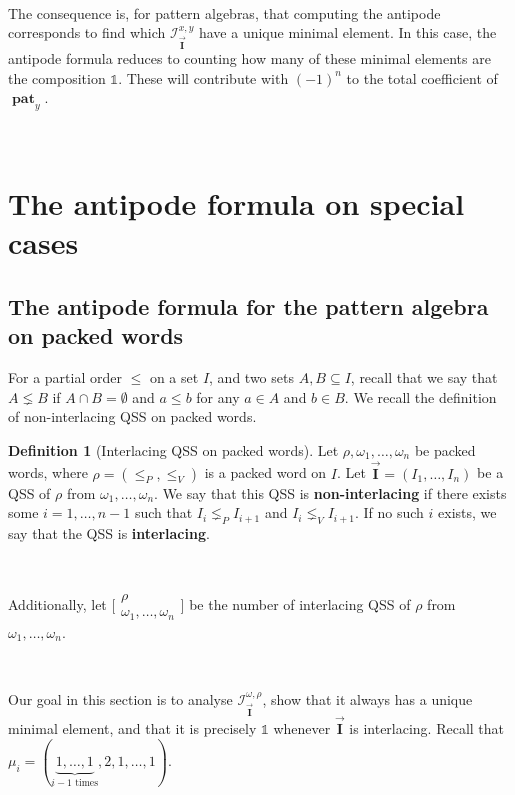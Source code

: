 \documentclass[12pt, reqno]{amsart}
\theoremstyle{definition}
\newtheorem{defin}[thm]{Definition}
\newcommand{\III}{\vec{\mathbf{I}}}
\DeclareMathOperator{\pat}{\mathbf{pat}}
\begin{document}

\

The consequence is, for pattern algebras, that computing the antipode corresponds to find which $\mathcal I_{\III}^{x, y}$ have a unique minimal element.
In this case, the antipode formula reduces to counting how many of these minimal elements are the composition $\mathbb{1}$.
These will contribute with $(-1)^n$ to the total coefficient of $\pat_y$.

\

\section{The antipode formula on special cases\label{sec:formula_pp}}
\subsection{The antipode formula for the pattern algebra on packed words\label{sec:formula_packed}}
For a partial order $\leq$ on a set $I$, and two sets $A, B \subseteq I$, recall that we say that $A \lneq B$ if $A\cap B = \emptyset$ and $a \leq b$ for any $a \in A$ and $b \in B$.
We recall the definition of non-interlacing QSS on packed words.


\begin{defin}[Interlacing QSS on packed words]
Let $\rho, \omega_1, \dots, \omega_n$ be packed words, where $\rho = (\leq_P, \leq_V)$ is a packed word on $I$.
Let $\III = (I_1, \dots, I_n)$ be a QSS of $\rho$ from $\omega_1, \dots, \omega_n$.
We say that this QSS is \textbf{non-interlacing} if there exists some $i = 1, \dots, n-1$ such that $I_i \lneq_P I_{i+1}$ and $I_i \lneq_V I_{i+1}$.
If no such $i$ exists, we say that the QSS is \textbf{interlacing}.

\

Additionally, let $ \bigl[\!\begin{smallmatrix} \rho  \\ \omega_1, \dots, \omega_n \end{smallmatrix}\!\bigr]$ be the number of interlacing QSS of $\rho$ from $\omega_1, \dots, \omega_n$.
\end{defin}

\

Our goal in this section is to analyse $\mathcal I^{\omega, \rho}_{\III}$, show that it always has a unique minimal element, and that it is precisely $\mathbb{1}$ whenever $\III$ is interlacing.
Recall that $\mu_i = (\underbrace{1, \dots , 1}_\text{$i-1$ times}, 2, 1, \dots, 1)$.
\end{document}
